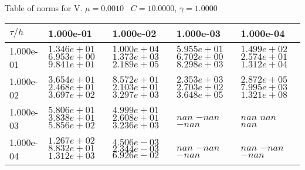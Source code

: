 \begin{center}
Table of norms for V. $\mu = 0.0010$ \, $C = 10.0000$, $\gamma = 1.0000$
  
\begin{tabular}{|p{1in}|p{1in}|p{1in}|p{1in}|p{1in}|} \hline
$\tau / h$ &1.000e-01 &1.000e-02 &1.000e-03 &1.000e-04 \\ \hline 
1.000e-01 & $1.346e+01$  $6.953e+00$  $9.841e+01$  & $1.000e+04$  $1.373e+03$  $2.189e+05$  & $5.955e+01$  $6.702e+00$  $8.298e+03$  & $1.499e+02$  $2.574e+01$  $1.312e+04$  \\ \hline 
1.000e-02 & $3.654e+01$  $2.468e+01$  $3.697e+02$  & $8.572e+01$  $2.103e+01$  $3.297e+03$  & $2.353e+03$  $2.703e+02$  $3.648e+05$  & $2.872e+05$  $7.995e+03$  $1.321e+08$  \\ \hline 
1.000e-03 & $5.806e+01$  $3.838e+01$  $5.856e+02$  & $4.999e+01$  $2.608e+01$  $3.236e+03$  & $nan$  $-nan$  $-nan$  & $nan$  $nan$  $nan$  \\ \hline 
1.000e-04 & $1.267e+02$  $8.832e+01$  $1.312e+03$  & $4.506e-03$  $2.344e-03$  $6.926e-02$  & $nan$  $-nan$  $-nan$  & $nan$  $-nan$  $-nan$  \\ \hline 

\end{tabular}\\[20pt]
\end{center}
